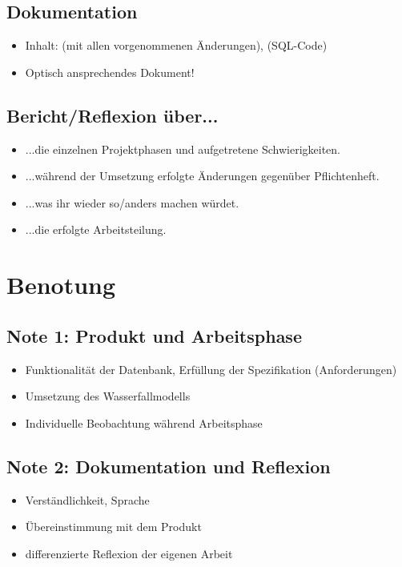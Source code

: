 {\subsection{Dokumentation}
\begin{itemize}
    \item Inhalt:  (mit allen vorgenommenen Änderungen),  (SQL-Code)
    \item Optisch ansprechendes Dokument!
\end{itemize}

\subsection{Bericht/Reflexion über...}
\begin{itemize}
    \item ...die einzelnen Projektphasen und aufgetretene Schwierigkeiten.
    \item ...während der Umsetzung erfolgte Änderungen gegenüber Pflichtenheft.
    \item ...was ihr wieder so/anders machen würdet.
    \item ...die erfolgte Arbeitsteilung.
\end{itemize}

\section{Benotung}
\subsection{Note 1: Produkt und Arbeitsphase}
\begin{itemize}
    \item Funktionalität der Datenbank, Erfüllung der Spezifikation (Anforderungen)
    \item Umsetzung des Wasserfallmodells
    \item Individuelle Beobachtung während Arbeitsphase
\end{itemize}

\subsection{Note 2: Dokumentation und Reflexion}
\begin{itemize}
    \item Verständlichkeit, Sprache
    \item Übereinstimmung mit dem Produkt
    \item differenzierte Reflexion der eigenen Arbeit
\end{itemize}
}